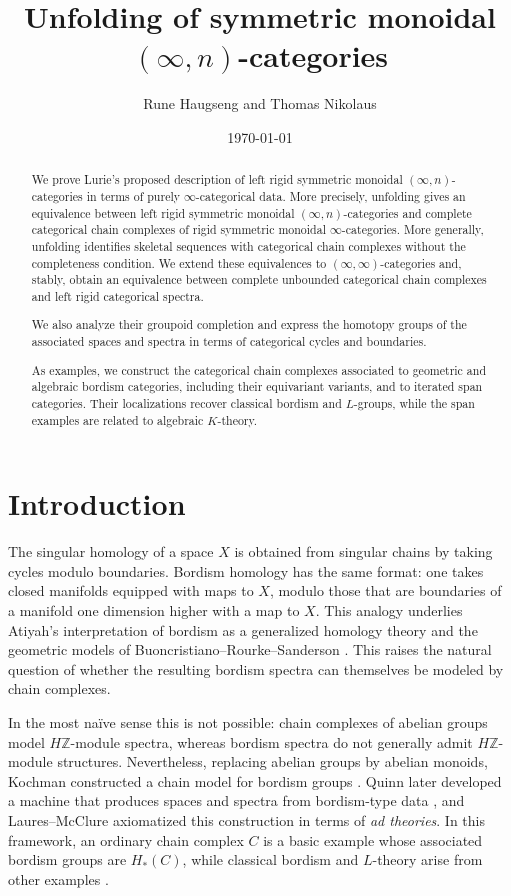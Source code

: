 \documentclass[a4paper,11pt]{article}
\title{Unfolding of symmetric monoidal $(\infty,n)$-categories}
\author{Rune Haugseng and Thomas Nikolaus}
\date{\today}
\begin{document}
\maketitle

\begin{abstract}
We prove Lurie’s proposed description of left rigid symmetric monoidal $(\infty,n)$-cate\-gories in terms of purely $\infty$-categorical data. More precisely, unfolding gives an equivalence between left rigid symmetric monoidal $(\infty,n)$-categories and complete categorical chain complexes of rigid symmetric monoidal $\infty$-categories. More generally, unfolding identifies skeletal sequences with categorical chain complexes without the completeness condition. We extend these equivalences to $(\infty,\infty)$-categories and, stably, obtain an equivalence between complete unbounded categorical chain complexes and left rigid categorical spectra.

We also analyze their groupoid completion and express the homotopy groups of the associated spaces and spectra in terms of categorical cycles and boundaries.

As examples, we construct the categorical chain complexes associated to geometric and algebraic bordism categories, including their equivariant variants, and to iterated span categories. Their localizations recover classical bordism and $L$-groups, while the span examples are related to algebraic $K$-theory.
\end{abstract}

\tableofcontents

\section{Introduction}

The singular homology of a space $X$ is obtained from singular chains by taking cycles modulo boundaries. Bordism homology has the same format: one takes closed manifolds equipped with maps to $X$, modulo those that are boundaries  of a manifold one dimension higher with a map to  $X$. This analogy underlies Atiyah's interpretation of bordism as a generalized homology theory \cite{AtiyahBordism} and the geometric models of Buoncristiano--Rourke--Sanderson \cite{BRS}. This raises the natural question of whether the resulting bordism spectra can themselves be modeled by chain complexes.

In the most na\"ive sense this is not possible: chain complexes of abelian groups model $H\mathbb Z$-module spectra, whereas bordism spectra do not generally admit $H\mathbb Z$-module structures. Nevertheless, replacing abelian groups by abelian monoids, Kochman constructed a chain model for bordism groups \cite{KochmanChain}. Quinn later developed a machine that produces spaces and spectra from bordism-type data \cite{QuinnAssembly}, and Laures--McClure axiomatized this construction in terms of \emph{ad theories}. In this framework, an ordinary chain complex $C$ is a basic example whose associated bordism groups are $H_{*}(C)$, while classical bordism and $L$-theory arise from other examples \cite{LauresMcClure}. \\
\end{document}
